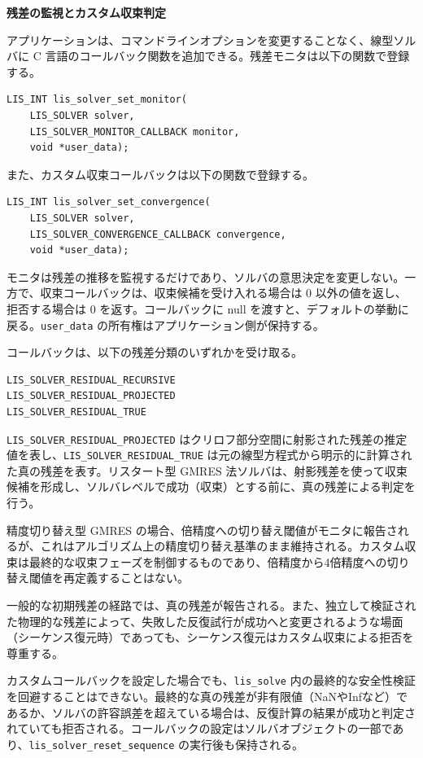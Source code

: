 \documentclass[a4paper]{jarticle}
\begin{document}
{{\noindent
{\bf 残差の監視とカスタム収束判定}

アプリケーションは、コマンドラインオプションを変更することなく、線型ソルバに C 言語のコールバック関数を追加できる。残差モニタは以下の関数で登録する。

\begin{verbatim}
LIS_INT lis_solver_set_monitor(
    LIS_SOLVER solver,
    LIS_SOLVER_MONITOR_CALLBACK monitor,
    void *user_data);
\end{verbatim}

また、カスタム収束コールバックは以下の関数で登録する。

\begin{verbatim}
LIS_INT lis_solver_set_convergence(
    LIS_SOLVER solver,
    LIS_SOLVER_CONVERGENCE_CALLBACK convergence,
    void *user_data);
\end{verbatim}

モニタは残差の推移を監視するだけであり、ソルバの意思決定を変更しない。一方で、収束コールバックは、収束候補を受け入れる場合は 0 以外の値を返し、拒否する場合は 0 を返す。コールバックに null を渡すと、デフォルトの挙動に戻る。\verb|user_data| の所有権はアプリケーション側が保持する。

コールバックは、以下の残差分類のいずれかを受け取る。

\begin{verbatim}
LIS_SOLVER_RESIDUAL_RECURSIVE
LIS_SOLVER_RESIDUAL_PROJECTED
LIS_SOLVER_RESIDUAL_TRUE
\end{verbatim}

\verb|LIS_SOLVER_RESIDUAL_PROJECTED| はクリロフ部分空間に射影された残差の推定値を表し、\verb|LIS_SOLVER_RESIDUAL_TRUE| は元の線型方程式から明示的に計算された真の残差を表す。リスタート型 GMRES 法ソルバは、射影残差を使って収束候補を形成し、ソルバレベルで成功（収束）とする前に、真の残差による判定を行う。

精度切り替え型 GMRES の場合、倍精度への切り替え閾値がモニタに報告されるが、これはアルゴリズム上の精度切り替え基準のまま維持される。カスタム収束は最終的な収束フェーズを制御するものであり、倍精度から4倍精度への切り替え閾値を再定義することはない。

一般的な初期残差の経路では、真の残差が報告される。また、独立して検証された物理的な残差によって、失敗した反復試行が成功へと変更されるような場面（シーケンス復元時）であっても、シーケンス復元はカスタム収束による拒否を尊重する。

カスタムコールバックを設定した場合でも、\verb|lis_solve| 内の最終的な安全性検証を回避することはできない。最終的な真の残差が非有限値（NaNやInfなど）であるか、ソルバの許容誤差を超えている場合は、反復計算の結果が成功と判定されていても拒否される。コールバックの設定はソルバオブジェクトの一部であり、\verb|lis_solver_reset_sequence| の実行後も保持される。

}}
\end{document}
